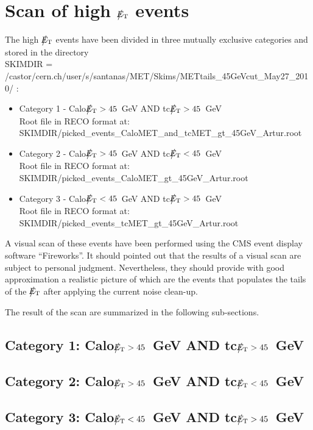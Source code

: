 \section{Scan of high $\big\slash\hspace{-1.6ex}{E_\text{T}}$ events}

The high $\big\slash\hspace{-1.6ex}{E_\text{T}}$ events have been divided in three mutually exclusive categories and stored in the directory \\ 
SKIMDIR = /castor/cern.ch/user/s/santanas/MET/Skims/METtails\_45GeVcut\_May27\_2010/ :
\begin{itemize}
\item Category 1 \quad - \quad Calo$\big\slash\hspace{-1.6ex}{E_\text{T}}>45$~GeV \quad AND \quad tc$\big\slash\hspace{-1.6ex}{E_\text{T}}>45$~GeV\\ 
Root file in RECO format at: \\ SKIMDIR/picked\_events\_CaloMET\_and\_tcMET\_gt\_45GeV\_Artur.root
\item Category 2 \quad - \quad Calo$\big\slash\hspace{-1.6ex}{E_\text{T}}>45$~GeV \quad AND \quad tc$\big\slash\hspace{-1.6ex}{E_\text{T}}<45$~GeV \\
Root file in RECO format at: \\ SKIMDIR/picked\_events\_CaloMET\_gt\_45GeV\_Artur.root
\item Category 3 \quad - \quad Calo$\big\slash\hspace{-1.6ex}{E_\text{T}}<45$~GeV \quad AND \quad tc$\big\slash\hspace{-1.6ex}{E_\text{T}}>45$~GeV \\
Root file in RECO format at: \\ SKIMDIR/picked\_events\_tcMET\_gt\_45GeV\_Artur.root
\end{itemize}

A visual scan of these events have been performed using the CMS event display
software ``Fireworks''. It should pointed out that the results of a visual scan 
are subject to personal judgment. Nevertheless, they should provide
with good approximation a realistic picture of which are the events that populates the tails
of the $\big\slash\hspace{-1.6ex}{E_\text{T}}$ after applying the current noise clean-up.

The result of the scan are summarized in the following sub-sections.

\subsection{Category 1: Calo$\big\slash\hspace{-1.6ex}{E_\text{T}}>45$~GeV AND tc$\big\slash\hspace{-1.6ex}{E_\text{T}}>45$~GeV}

\subsection{Category 2: Calo$\big\slash\hspace{-1.6ex}{E_\text{T}}>45$~GeV AND tc$\big\slash\hspace{-1.6ex}{E_\text{T}}<45$~GeV}

\subsection{Category 3: Calo$\big\slash\hspace{-1.6ex}{E_\text{T}}<45$~GeV AND tc$\big\slash\hspace{-1.6ex}{E_\text{T}}>45$~GeV}